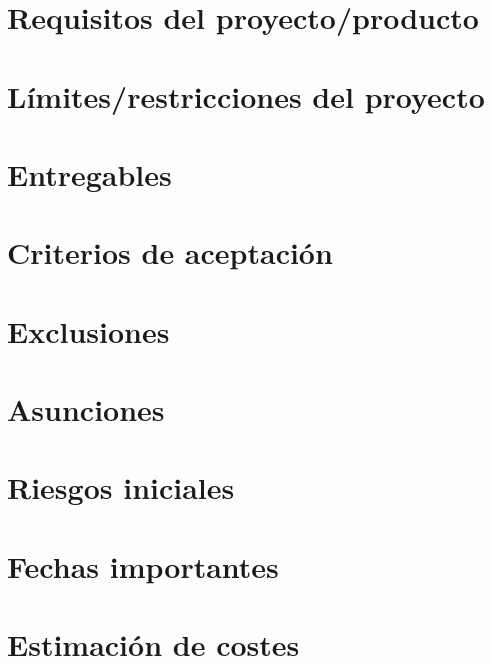 \documentclass[a4paper,10pt]{article}
\begin{document}
\section{Requisitos del proyecto/producto}

\section{Límites/restricciones del proyecto}

\section{Entregables}

\section{Criterios de aceptación}

\section{Exclusiones}

\section{Asunciones}

\section{Riesgos iniciales}

\section{Fechas importantes}

\section{Estimación de costes}



\end{document}

